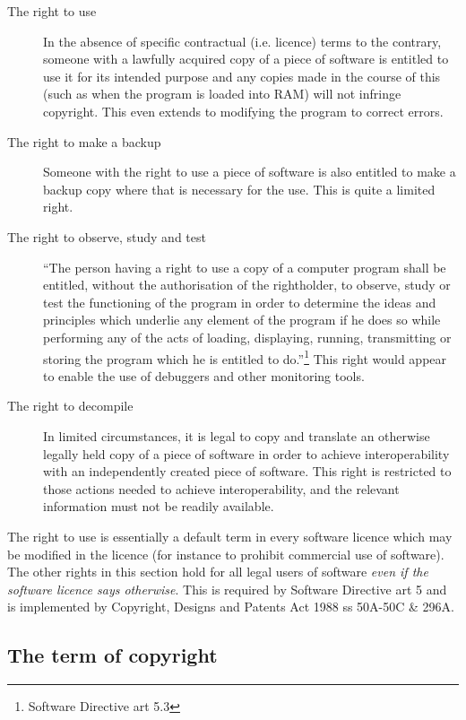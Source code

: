 \documentclass[a4paper,12pt]{article}
\newcommand{\CDPA}[1][]{Copyright, Designs and Patents Act 1988 #1\xspace}
\newcommand{\SD}[1][]{Software Directive #1\xspace}
\begin{document}
\begin{description}
\item[The right to use] In the absence of specific contractual
  (i.e. licence) terms to the contrary, someone with a lawfully acquired
  copy of a piece of software is entitled to use it for its intended purpose
  and any copies made in the course of this (such as when the program is
  loaded into RAM) will not infringe copyright. This even extends to
  modifying the program to correct errors.
\item[The right to make a backup] Someone with the right to use a piece of
  software is also entitled to make a backup copy where that is necessary
  for the use. This is quite a limited right.
\item[The right to observe, study and test] ``The person having a right to
  use a copy of a computer program shall be entitled, without the
  authorisation of the rightholder, to observe, study or test the
  functioning of the program in order to determine the ideas and principles
  which underlie any element of the program if he does so while performing
  any of the acts of loading, displaying, running, transmitting or storing
  the program which he is entitled to do.''\footnote{\SD[art 5.3]} This
  right would appear to enable the use of debuggers and other monitoring
  tools.
\item [The right to decompile] In limited circumstances, it is legal to copy
  and translate an otherwise legally held copy of a piece of software in
  order to achieve interoperability with an independently created piece of
  software. This right is restricted to those actions needed to achieve
  interoperability, and the relevant information must not be readily
  available.
\end{description}

The right to use is essentially a default term in every software licence
which may be modified in the licence (for instance to prohibit commercial
use of software). The other rights in this
section hold for all legal users of software \emph{even if the software
  licence says otherwise}. This is required by \SD[art 5] and is implemented
by \CDPA[ss 50A-50C \& 296A].

\subsection{The term of copyright}
\end{document}

